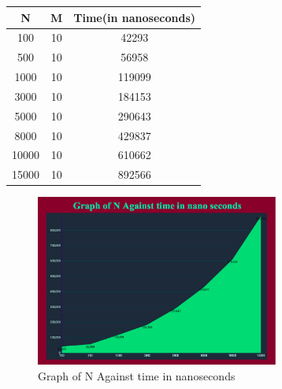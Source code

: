 \documentclass[conference]{IEEEtran}
\begin{document}
 \begin{center}
 \begin{tabular}{||c| c| c||} 
 \hline
 N & M & Time(in nanoseconds) \\ [0.5ex] 
 \hline\hline
 100 & 10 & 42293  \\ 
 \hline
 500 & 10 & 56958  \\ 
 \hline
 1000 & 10 & 119099  \\ 
 \hline
 3000 & 10 & 184153  \\ 
 \hline
 5000 & 10 & 290643  \\ 
 \hline
 8000 & 10 & 429837  \\ 
 \hline
 10000 & 10 & 610662  \\ 
 \hline
 15000 & 10 & 892566  \\ [1ex] 
  \hline
\end{tabular}
\end{center}

\begin{figure}[h]
\caption{Graph of N Against time in nanoseconds\\}
\centering
\includegraphics[width=8cm]{images/graphn.png}
\end{figure}
\end{document}
